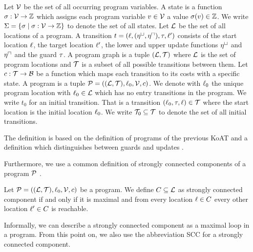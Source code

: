 \begin{definition}[Program] 
  Let $\mathcal{V}$ be the set of all occurring program variables.
  A state is a function $\sigma: \mathcal{V} \rightarrow \mathbb{Z}$ which assigns each program variable $v \in \mathcal{V}$ a value $\sigma(v) \in \mathbb{Z}$.
  We write $\Sigma = \lbrace  \sigma \mid \sigma: \mathcal{V} \rightarrow \mathbb{Z} \rbrace$ to denote the set of all states.
  Let $\mathcal{L}$ be the set of all locations of a program.
  A transition $t = (\ell, (\eta^\sqcup, \eta^\sqcap), \tau, \ell')$ consists of the start location $\ell$, the target location $\ell'$, the lower and upper update functions $\eta^\sqcup$ and $\eta^\sqcap$ and the guard $\tau$. 
  A program graph is a tuple $(\mathcal{L}, \mathcal{T})$ where $\mathcal{L}$ is the set of program locations and $\mathcal{T}$ is a subset of all possible transitions between them.
  Let $c: \mathcal{T} \rightarrow \mathcal{B}$ be a function which maps each transition to its costs with a specific state.
  A program is a tuple $\mathcal{P} = ((\mathcal{L}, \mathcal{T}), \ell_0, \mathcal{V}, c)$.
  We denote with $\ell_0$ the unique program location with $\ell_0 \in \mathcal{L}$ which has no entry transitions in the program.
  We write $t_0$ for an initial transition. That is a transition $(\ell_0, \tau, \ell) \in \mathcal{T}$ where the start location is the initial location $\ell_0$.
  We write $\mathcal{T}_0 \subseteq \mathcal{T}$ to denote the set of all initial transitions.
\end{definition}
The definition is based on the definition of programs of the previous KoAT \cite{koat} and a definition which distinguishes between guards and updates \cite{lowerruntime}.

Furthermore, we use a common definition of strongly connected components of a program $\mathcal{P}$ \cite{sccs}.

\begin{definition}
  Let $\mathcal{P} = ((\mathcal{L}, \mathcal{T}), \ell_0, \mathcal{V}, c)$ be a program.
  We define $C \subseteq \mathcal{L}$ as strongly connected component if and only if it is maximal and from every location $\ell \in C$ every other location $\ell' \in C$ is reachable.
\end{definition}

Informally, we can describe a strongly connected component as a maximal loop in a program.
From this point on, we also use the abbreviation SCC for a strongly connected component.

